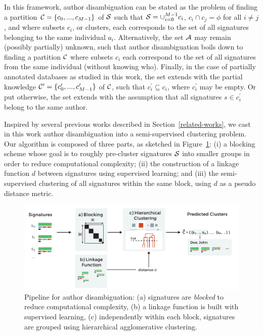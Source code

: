 \documentclass{article}
\begin{document}
In this
framework, author disambiguation can be stated as the problem of
finding a partition ${\cal C} = \{ c_0, ..., c_{M-1} \}$ of ${\cal S}$ such
that ${\cal S} = \cup_{i=0}^{M-1} c_i$, $c_i \cap c_j = \phi$ for all $i \neq
j$, and where subsets $c_i$, or clusters, each corresponds to the set of all
signatures belonging to the same individual $a_i$. Alternatively, the set
${\cal A}$ may remain (possibly partially) unknown, such that author
disambiguation boils down to finding a partition ${\cal C}$ where
subsets $c_i$  each correspond to the set of all signatures from the same
individual (without knowing who). Finally, in the case of partially annotated databases as studied in
this work, the set extends with the partial knowledge ${\cal C}^\prime = \{ c_0^\prime, ..., c_{M-1}^\prime \}$ of ${\cal C}$,
such that $c_i^\prime \subseteq c_i$, where $c_i^\prime$ may be empty.
Or put otherwise, the set extends with the assumption that all signatures
$s \in c_i^\prime$ belong to the same author.

Inspired by several previous works described in Section~\ref{related-works},
we cast in this work author disambiguation into a semi-supervised clustering
problem.
Our algorithm is composed of three parts, as sketched in Figure~\ref{fig:workflow}: (i) a blocking
scheme whose goal is to roughly pre-cluster signatures ${\cal S}$ into smaller groups in order to
reduce computational complexity; (ii) the construction of a linkage function
$d$ between signatures using supervised learning; and (iii) the
semi-supervised clustering of all signatures within the same block, using $d$ as a pseudo distance metric.


\begin{figure}
\centering
\includegraphics[width=\textwidth]{fig-workflow}
\caption{Pipeline for author disambiguation: (a)
signatures are \textit{blocked} to reduce computational complexity, (b) a linkage
function is built with supervised learning, (c) independently within each block, signatures
are grouped using hierarchical agglomerative clustering.}
\label{fig:workflow}
\end{figure}
\end{document}

